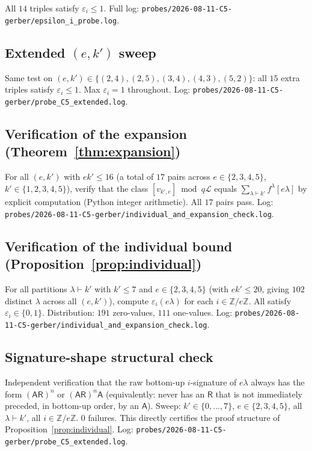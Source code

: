 \documentclass[11pt]{article}
\theoremstyle{definition}
\newcommand{\vke}{v_{k',e}}
\newcommand{\ZZ}{\mathbb{Z}}
\newcommand{\Lcr}{\mathcal{L}}
\newcommand{\eps}{\varepsilon}
\newcommand{\Aa}{{\mathsf A}}
\newcommand{\Rr}{{\mathsf R}}
\begin{document}
All $14$ triples satisfy $\eps_i \le 1$. Full log:
\verb|probes/2026-08-11-C5-gerber/epsilon_i_probe.log|.

\subsection{Extended $(e, k')$ sweep}

Same test on $(e, k') \in \{(2,4), (2,5), (3,4), (4,3), (5,2)\}$: all $15$
extra triples satisfy $\eps_i \le 1$. Max $\eps_i = 1$ throughout.
Log: \verb|probes/2026-08-11-C5-gerber/probe_C5_extended.log|.

\subsection{Verification of the expansion (Theorem~\ref{thm:expansion})}

For all $(e, k')$ with $e k' \le 16$ (a total of $17$ pairs across
$e \in \{2, 3, 4, 5\}$, $k' \in \{1, 2, 3, 4, 5\}$), verify that the class
$[\vke] \bmod q\Lcr$ equals $\sum_{\lambda \vdash k'} f^\lambda [e\lambda]$
by explicit computation (Python integer arithmetic).
All $17$ pairs pass. Log:
\verb|probes/2026-08-11-C5-gerber/individual_and_expansion_check.log|.

\subsection{Verification of the individual bound (Proposition~\ref{prop:individual})}

For all partitions $\lambda \vdash k'$ with $k' \le 7$ and $e \in \{2, 3, 4, 5\}$
(with $e k' \le 20$, giving $102$ distinct $\lambda$ across all $(e, k')$),
compute $\eps_i(e\lambda)$ for each $i \in \ZZ/e\ZZ$. All satisfy
$\eps_i \in \{0, 1\}$. Distribution: $191$ zero-values, $111$ one-values.
Log: \verb|probes/2026-08-11-C5-gerber/individual_and_expansion_check.log|.

\subsection{Signature-shape structural check}

Independent verification that the raw bottom-up $i$-signature of $e\lambda$
always has the form
$(\Aa\Rr)^n$ or $(\Aa\Rr)^n \Aa$
(equivalently: never has an $\Rr$ that is not immediately preceded, in
bottom-up order, by an $\Aa$). Sweep: $k' \in \{0, \dots, 7\}$,
$e \in \{2, 3, 4, 5\}$, all $\lambda \vdash k'$, all $i \in \ZZ/e\ZZ$.
$0$ failures. This directly certifies the proof structure of
Proposition~\ref{prop:individual}. Log:
\verb|probes/2026-08-11-C5-gerber/probe_C5_extended.log|.
\end{document}
